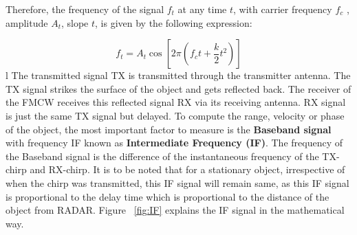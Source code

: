 Therefore, the frequency of the signal \(f_{t}\) at any time \(t\), with carrier frequency \(f_{c}\) , amplitude \(A_{t}\), slope \(t\), is given by the following expression:

\[f_{t}= A_{t}\cos[2\pi(f_{c}t + \frac{k}{2}t^2)]\]
l
The transmitted signal TX is transmitted through the transmitter antenna. The TX signal strikes the surface of the object and gets reflected back. The receiver of the FMCW receives this reflected signal RX via its receiving antenna. RX signal is just the same TX signal but delayed.
To compute the range, velocity or phase of the object, the most important factor to measure is the \textbf{Baseband signal} with frequency IF known as \textbf{Intermediate Frequency (IF)}. The frequency of the Baseband signal is the difference of the instantaneous frequency of the TX-chirp and RX-chirp. It is to be noted that for a stationary object, irrespective of when the  chirp was transmitted, this IF signal will remain same, as this IF signal is proportional to the delay time which is proportional to the distance of the object from RADAR. Figure ~\ref{fig:IF} explains the IF signal in the mathematical way. 

